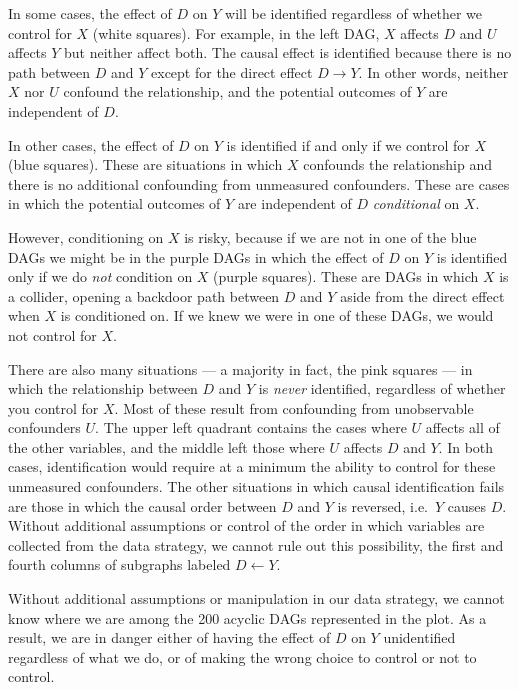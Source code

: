 \documentclass[
]{article}
\begin{document}
In some cases, the effect of \(D\) on \(Y\) will be identified
regardless of whether we control for \(X\) (white squares). For example,
in the left DAG, \(X\) affects \(D\) and \(U\) affects \(Y\) but neither
affect both. The causal effect is identified because there is no path
between \(D\) and \(Y\) except for the direct effect \(D\rightarrow Y\).
In other words, neither \(X\) nor \(U\) confound the relationship, and
the potential outcomes of \(Y\) are independent of \(D\).

In other cases, the effect of \(D\) on \(Y\) is identified if and only
if we control for \(X\) (blue squares). These are situations in which
\(X\) confounds the relationship and there is no additional confounding
from unmeasured confounders. These are cases in which the potential
outcomes of \(Y\) are independent of \(D\) \emph{conditional} on \(X\).

However, conditioning on \(X\) is risky, because if we are not in one of
the blue DAGs we might be in the purple DAGs in which the effect of
\(D\) on \(Y\) is identified only if we do \emph{not} condition on \(X\)
(purple squares). These are DAGs in which \(X\) is a collider, opening a
backdoor path between \(D\) and \(Y\) aside from the direct effect when
\(X\) is conditioned on. If we knew we were in one of these DAGs, we
would not control for \(X\).

There are also many situations --- a majority in fact, the pink squares
--- in which the relationship between \(D\) and \(Y\) is \emph{never}
identified, regardless of whether you control for \(X\). Most of these
result from confounding from unobservable confounders \(U\). The upper
left quadrant contains the cases where \(U\) affects all of the other
variables, and the middle left those where \(U\) affects \(D\) and
\(Y\). In both cases, identification would require at a minimum the
ability to control for these unmeasured confounders. The other
situations in which causal identification fails are those in which the
causal order between \(D\) and \(Y\) is reversed, i.e.~\(Y\) causes
\(D\). Without additional assumptions or control of the order in which
variables are collected from the data strategy, we cannot rule out this
possibility, the first and fourth columns of subgraphs labeled
\(D\leftarrow Y\).

Without additional assumptions or manipulation in our data strategy, we
cannot know where we are among the 200 acyclic DAGs represented in the
plot. As a result, we are in danger either of having the effect of \(D\)
on \(Y\) unidentified regardless of what we do, or of making the wrong
choice to control or not to control.
\end{document}
